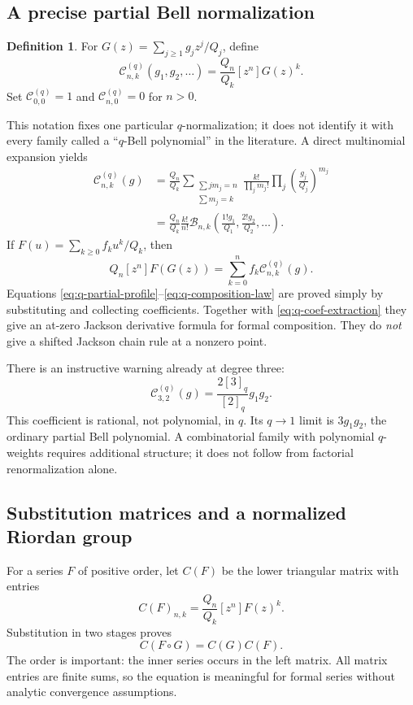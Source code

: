 \documentclass[11pt,a4paper]{article}
\numberwithin{equation}{section}
\theoremstyle{definition}
\newtheorem{definition}[theorem]{Definition}
\theoremstyle{remark}
\newcommand{\coef}[2]{[#1^{#2}]}
\newcommand{\Bcal}{\mathcal B}
\begin{document}
\subsection{A precise partial Bell normalization}
\begin{definition}
For $G(z)=\sum_{j\ge1}g_jz^j/Q_j$, define
\begin{equation}
 \mathcal C^{(q)}_{n,k}(g_1,g_2,\ldots)
 =\frac{Q_n}{Q_k}\coef zn G(z)^k.
 \label{eq:q-composition-coeff}
\end{equation}
Set $\mathcal C^{(q)}_{0,0}=1$ and
$\mathcal C^{(q)}_{n,0}=0$ for $n>0$.
\end{definition}
This notation fixes one particular $q$-normalization; it does not identify
it with every family called a ``$q$-Bell polynomial'' in the literature.
A direct multinomial expansion yields
\begin{align}
 \mathcal C^{(q)}_{n,k}(g)
 &=\frac{Q_n}{Q_k}
   \sum_{\substack{\sum jm_j=n\\\sum m_j=k}}
       \frac{k!}{\prod_jm_j!}
       \prod_j\left(\frac{g_j}{Q_j}\right)^{m_j}
 \label{eq:q-partial-profile}\\
 &=\frac{Q_n}{Q_k}\frac{k!}{n!}
   \Bcal_{n,k}\left(\frac{1!g_1}{Q_1},
                   \frac{2!g_2}{Q_2},\ldots\right).
 \label{eq:q-partial-ordinary}
\end{align}
If $F(u)=\sum_{k\ge0}f_ku^k/Q_k$, then
\begin{equation}
 Q_n\coef zn F(G(z))
    =\sum_{k=0}^n f_k\mathcal C^{(q)}_{n,k}(g).
 \label{eq:q-composition-law}
\end{equation}
Equations \eqref{eq:q-partial-profile}--\eqref{eq:q-composition-law}
are proved simply by substituting and collecting coefficients. Together
with \cref{eq:q-coef-extraction} they give an at-zero Jackson derivative
formula for formal composition. They do \emph{not} give a shifted
Jackson chain rule at a nonzero point.

There is an instructive warning already at degree three:
\begin{equation}
 \mathcal C^{(q)}_{3,2}(g)
       =\frac{2[3]_q}{[2]_q}g_1g_2.
 \label{eq:q-partial-warning}
\end{equation}
This coefficient is rational, not polynomial, in $q$. Its $q\to1$
limit is $3g_1g_2$, the ordinary partial Bell polynomial. A combinatorial
family with polynomial $q$-weights requires additional structure; it
does not follow from factorial renormalization alone.

\subsection{Substitution matrices and a normalized Riordan group}
For a series $F$ of positive order, let $C(F)$ be the lower triangular
matrix with entries
\[
 C(F)_{n,k}=\frac{Q_n}{Q_k}\coef zn F(z)^k.
\]
Substitution in two stages proves
\begin{equation}
 C(F\circ G)=C(G)C(F).
 \label{eq:q-substitution-matrix}
\end{equation}
The order is important: the inner series occurs in the left matrix.
All matrix entries are finite sums, so the equation is meaningful for
formal series without analytic convergence assumptions.
\end{document}
